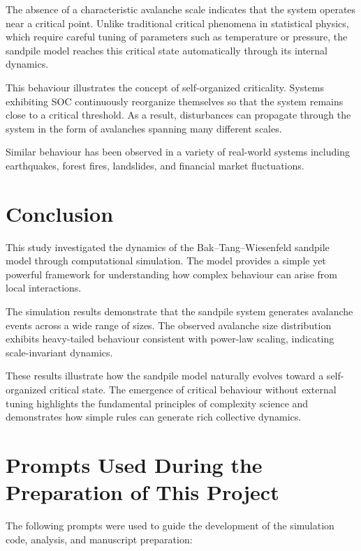 \documentclass[12pt]{article}
\begin{document}
The absence of a characteristic avalanche scale indicates that the system operates near a critical point. Unlike traditional critical phenomena in statistical physics, which require careful tuning of parameters such as temperature or pressure, the sandpile model reaches this critical state automatically through its internal dynamics.

This behaviour illustrates the concept of self-organized criticality. Systems exhibiting SOC continuously reorganize themselves so that the system remains close to a critical threshold. As a result, disturbances can propagate through the system in the form of avalanches spanning many different scales.

Similar behaviour has been observed in a variety of real-world systems including earthquakes, forest fires, landslides, and financial market fluctuations.

\section{Conclusion}

This study investigated the dynamics of the Bak--Tang--Wiesenfeld sandpile model through computational simulation. The model provides a simple yet powerful framework for understanding how complex behaviour can arise from local interactions.

The simulation results demonstrate that the sandpile system generates avalanche events across a wide range of sizes. The observed avalanche size distribution exhibits heavy-tailed behaviour consistent with power-law scaling, indicating scale-invariant dynamics.

These results illustrate how the sandpile model naturally evolves toward a self-organized critical state. The emergence of critical behaviour without external tuning highlights the fundamental principles of complexity science and demonstrates how simple rules can generate rich collective dynamics.
\section{Prompts Used During the Preparation of This Project}

The following prompts were used to guide the development of the simulation code, analysis, and manuscript preparation:
\end{document}
